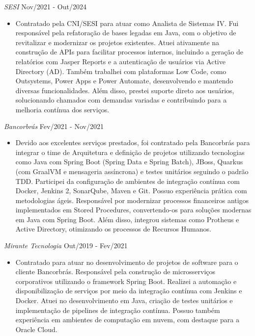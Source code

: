 \documentclass{res}
\begin{document}
\begin{resume}
		{\sl SESI} \hfill Nov/2021 - Out/2024
		\begin{itemize}
			\item Contratado pela CNI/SESI para atuar como Analista de Sistemas IV. Fui responsável pela refatoração de bases legadas em Java, com o objetivo de revitalizar e modernizar os projetos existentes. Atuei ativamente na construção de APIs para facilitar processos internos, incluindo a geração de relatórios com Jasper Reports e a autenticação de usuários via Active Directory (AD). Também trabalhei com plataformas Low Code, como Outsystems, Power Apps e Power Automate, desenvolvendo e mantendo diversas funcionalidades. Além disso, prestei suporte direto aos usuários, solucionando chamados com demandas variadas e contribuindo para a melhoria contínua dos serviços.
		\end{itemize}
		
		{\sl Bancorbrás} \hfill Fev/2021 - Nov/2021
		\begin{itemize}
			\item Devido aos excelentes serviços prestados, foi contratado pela Bancorbrás para integrar o time de Arquitetura e definição de projetos utilizando tecnologias como Java com Spring Boot (Spring Data e Spring Batch), JBoss, Quarkus (com GraalVM e mensageria assíncrona) e testes unitários seguindo o padrão TDD. Participei da configuração de ambientes de integração contínua com Docker, Jenkins 2, SonarQube, Maven e Git. Possuo experiência prática com metodologias ágeis. Responsável por modernizar processos financeiros antigos implementados em Stored Procedures, convertendo-os para soluções modernas em Java com Spring Boot. Além disso, integrou sistemas como Protheus e Active Directory, otimizando os processos de Recursos Humanos.
		\end{itemize}
		
		{\sl Mirante Tecnologia} \hfill Out/2019 - Fev/2021
		\begin{itemize}
			\item Contratado para atuar no desenvolvimento de projetos de software para o cliente Bancorbrás. Responsável pela construção de microsserviços corporativos utilizando o framework Spring Boot. Realizei a automação e disponibilização de serviços por meio da integração contínua com Jenkins e Docker. Atuei no desenvolvimento em Java, criação de testes unitários e implementação de pipelines de integração contínua. Possuo também experiência em ambientes de computação em nuvem, com destaque para a Oracle Cloud. 
		\end{itemize}
		

\end{resume}
\end{document}
